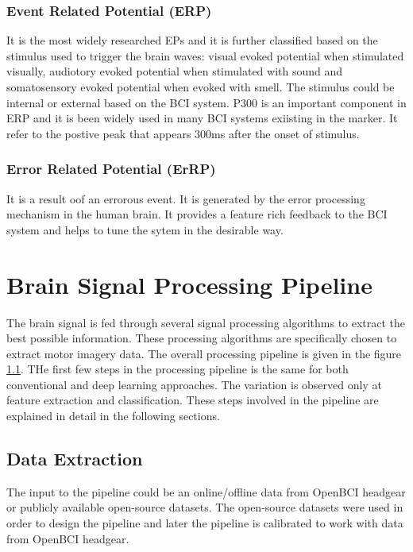     \subsubsection{Event Related Potential (ERP)}
It is the most widely researched EPs and it is further classified based on the stimulus used to trigger the brain waves: visual evoked potential when stimulated visually, audiotory evoked potential when stimulated with sound and somatosensory evoked potential when evoked with smell. The stimulus could be internal or external based on the BCI system. P300 is an important component in ERP and it is been widely used in many BCI systems exiisting in the marker. It refer to the postive peak that appears 300ms after the onset of stimulus.

    \subsubsection{Error Related Potential (ErRP)}
It is a result oof an errorous event. It is generated by the error processing mechanism in the human brain. It provides a feature rich feedback to the BCI system and helps to tune the sytem in the desirable way.

\section{Brain Signal Processing Pipeline}
The brain signal is fed through several signal processing algorithms to extract the best possible information. These processing algorithms are specifically chosen to  extract motor imagery data. The overall processing pipeline is given in the figure \ref{}. THe first few steps in the processing pipeline is the same for both conventional and deep learning approaches.  The variation is observed only at feature extraction and classification. These steps involved in the pipeline are explained in detail in the following sections.

\subsection{Data Extraction}
The input to the pipeline could be an online/offline data from OpenBCI headgear or publicly available open-source datasets. The open-source datasets were used in order to design the pipeline and later the pipeline is calibrated to work with data from OpenBCI headgear.

